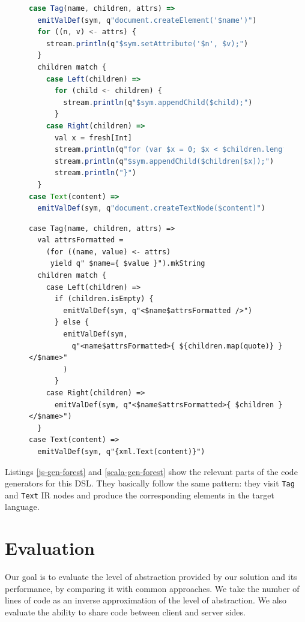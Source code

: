 \documentclass{llncs}
\newcommand{\code}[1]{\lstinline[language=Scala,columns=fixed,basicstyle=\footnotesize]|#1|}
\begin{document}
\begin{figure}
\begin{lstlisting}[language=JavaScript,label=js-gen-forest,caption=JavaScript code generator for the
DOM fragment definition DSL]
case Tag(name, children, attrs) =>
  emitValDef(sym, q"document.createElement('$name')")
  for ((n, v) <- attrs) {
    stream.println(q"$sym.setAttribute('$n', $v);")
  }
  children match {
    case Left(children) =>
      for (child <- children) {
        stream.println(q"$sym.appendChild($child);")
      }
    case Right(children) =>
      val x = fresh[Int]
      stream.println(q"for (var $x = 0; $x < $children.length; $x++) {")
      stream.println(q"$sym.appendChild($children[$x]);")
      stream.println("}")
  }
case Text(content) =>
  emitValDef(sym, q"document.createTextNode($content)")
\end{lstlisting}
\end{figure}

\begin{figure}
\begin{lstlisting}[label=scala-gen-forest,caption=Scala code generator for the DOM fragment
definition DSL]
case Tag(name, children, attrs) =>
  val attrsFormatted =
    (for ((name, value) <- attrs)
     yield q" $name={ $value }").mkString
  children match {
    case Left(children) =>
      if (children.isEmpty) {
        emitValDef(sym, q"<$name$attrsFormatted />")
      } else {
        emitValDef(sym,
          q"<name$attrsFormatted>{ ${children.map(quote)} }</$name>"
        )
      }
    case Right(children) =>
      emitValDef(sym, q"<$name$attrsFormatted>{ $children }</$name>")
  }
case Text(content) =>
  emitValDef(sym, q"{xml.Text(content)}")
\end{lstlisting}
\end{figure}

Listings \ref{js-gen-forest} and \ref{scala-gen-forest} show the relevant parts of the code
generators for this DSL. They basically follow the same pattern: they visit \code{Tag} and
\code{Text} IR nodes and produce the corresponding elements in the target language.


\section{Evaluation}
\label{sec:validation}

Our goal is to evaluate the level of abstraction provided by our solution and its performance, by
comparing it with common approaches. We take the number of lines of code as an inverse approximation
of the level of abstraction. We also evaluate the ability to share code between client and server
sides.
\end{document}
